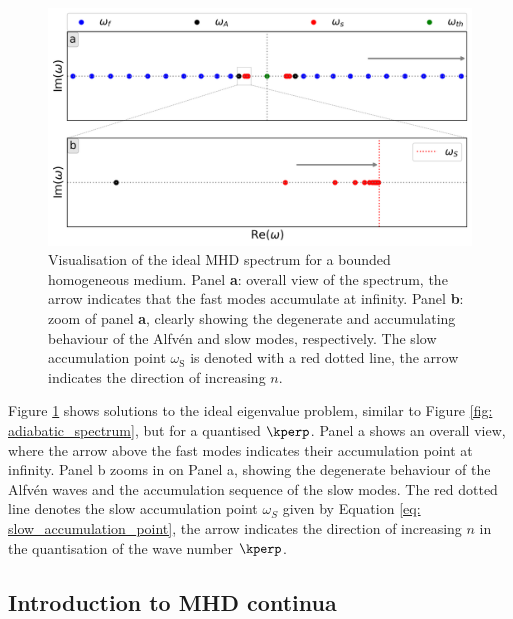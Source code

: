 \begin{figure}[t]
  \centering
  \includegraphics[width=\textwidth]{bounded_ideal_spectrum.png}
  \caption{
    Visualisation of the ideal MHD spectrum for a bounded homogeneous medium. Panel \textbf{a}: overall view of the spectrum, the arrow indicates that the fast modes accumulate at infinity.
    Panel \textbf{b}: zoom of panel \textbf{a}, clearly showing the degenerate and accumulating behaviour of the Alfv\'en and slow modes, respectively. The slow accumulation point $\omega_\text{S}$ is denoted with a red dotted line, the arrow indicates the direction of increasing $n$.
  }
  \label{fig: bounded_spectrum}
\end{figure}

Figure \ref{fig: bounded_spectrum} shows solutions to the ideal eigenvalue problem, similar to Figure \ref{fig: adiabatic_spectrum}, but for a quantised $\kperp$. Panel a shows an overall view, where the arrow above the fast modes indicates their accumulation point at infinity. Panel b zooms in on Panel a, showing the degenerate behaviour of the Alfv\'en waves and the accumulation sequence of the slow modes. The red dotted line denotes the slow accumulation point $\omega_S$ given by Equation \eqref{eq: slow_accumulation_point}, the arrow indicates the direction of increasing $n$ in the quantisation of the wave number $\kperp$.

\subsection{Introduction to MHD continua} \label{ss: mhd_continua}

